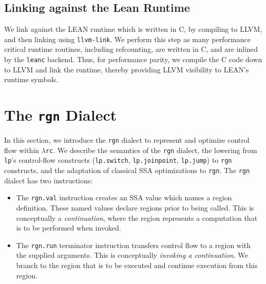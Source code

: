 \documentclass[conference]{IEEEtran}
\newcommand{\lpjump}{\textcolor{pairedTwoDarkBlue}{\texttt{lp.jump}}}
\newcommand{\lpjoinpoint}{\textcolor{pairedTwoDarkBlue}{\texttt{lp.joinpoint}}}
\newcommand{\lpswitch}{\textcolor{pairedTwoDarkBlue}{\texttt{lp.switch}}}
\newcommand{\lp}{\textcolor{pairedTwoDarkBlue}{\texttt{lp}}}
\newcommand{\rgn}{\textcolor{pairedSixDarkRed}{\texttt{rgn}}}
\newcommand{\rgnval}{\textcolor{pairedSixDarkRed}{\texttt{rgn.val}}}
\newcommand{\rgnrun}{\textcolor{pairedSixDarkRed}{\texttt{rgn.run}}}
\newcommand{\lambdarc}{\ensuremath{\lambda}\texttt{rc}}
\begin{document}



\subsection{Linking against the Lean Runtime}

We link against the LEAN runtime which is written in C, by compiling to LLVM, and then linking using
\texttt{llvm-link}. We perform this step as many performance critical runtime routines, including refcounting,
are written in C, and are inlined by the \texttt{leanc} backend. Thus, for performance parity,
we compile the C code down to LLVM and link the runtime, thereby providing LLVM visibility to LEAN's runtime symbols.

\section{The \rgn{} Dialect}


In this section, we introduce the \rgn{} dialect to represent and optimize control flow
within \lambdarc{}. We describe the semantics of the \rgn{} dialect, the lowering from
\lp{}'s control-flow constructs (\lpswitch{}, \lpjoinpoint{}, \lpjump{}) to \rgn{} constructs,
and the adaptation of classical SSA optimizations to \rgn{}. The \rgn{} dialect
has two instructions:

\begin{itemize}
\item The \rgnval{} instruction creates an SSA value which names a region definition. These named values
 declare regions prior to being called. This is conceptually a \emph{continuation}, where the region represents
 a computation that is to be performed when invoked.
\item The \rgnrun{} terminator instruction transfers control flow to a region with the supplied arguments.
   This is conceptually \emph{invoking a continuation}. We branch to the region that is to be executed
    and continue execution from this region.
\end{itemize}
\end{document}

